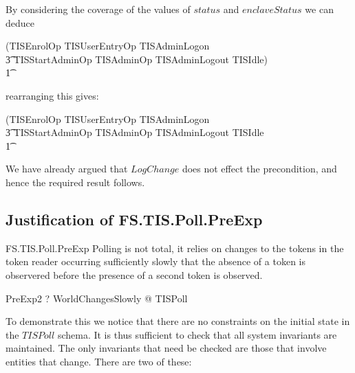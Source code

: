 By considering the coverage of the values of $status$ and
$enclaveStatus$ we can deduce
\begin{argue}
 \pre (TISEnrolOp \lor TISUserEntryOp \lor TISAdminLogon 
\\ \t3                  \lor TISStartAdminOp \lor  TISAdminOp \lor
TISAdminLogout \lor TISIdle) 
\\ \t1  \equiv [~ IDStation; RealWorld | 
\\      \t4 (status = quiescent \land enclaveStatus = enclaveQuiescent ) 
\\      \t4 \lor (status \neq quiescent) 
\\      \t4 \lor (enclaveStatus \neq enclaveQuiescent \land enclaveStatus \neq
shutdown) ~]
\end{argue}
rearranging this gives:
\begin{argue}
 \pre (TISEnrolOp \lor TISUserEntryOp \lor TISAdminLogon 
\\ \t3                  \lor TISStartAdminOp \lor  TISAdminOp \lor
TISAdminLogout \lor TISIdle 
\\ \t1 
\end{argue}

We have already argued that $LogChange$ does not effect the
precondition, and hence the required result follows.

\subsection{Justification of FS.TIS.Poll.PreExp}

\begin{Zpobtrace}{FS.TIS.Poll.PreExp}
Polling is not total, it relies on changes to the tokens in the token
reader occurring sufficiently slowly that the absence of a token is
observered before the presence of a second token is observed.
\begin{theorem}
PreExp2 \vdash? \forall WorldChangesSlowly @ \pre TISPoll
\end{theorem}
\end{Zpobtrace}

To demonstrate this we notice that there are no constraints on the initial
state in the $TISPoll$ schema. 
It is thus sufficient to check that all system invariants are
maintained. 
The only invariants that need be checked are those that
involve entities that change. There are two of these:

